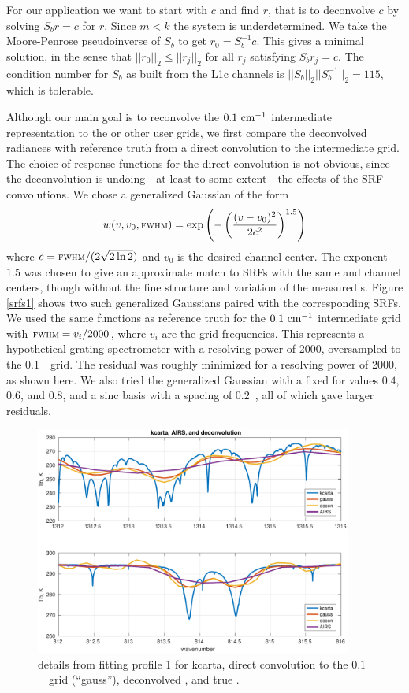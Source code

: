 \documentclass[11pt]{article}
\begin{document}
For our application we want to start with $c$ and find $r$, that is
to deconvolve $c$ by solving $S_b r = c$ for $r$.  Since $m < k$ the
system is underdetermined.  We take the Moore-Penrose pseudoinverse
\cite{wiki:pinv} of $S_b$ to get $r_0 = S_b^{-1} c$.  This gives a
minimal solution, in the sense that $||r_0||_2 \le ||r_j||_2$ for
all $r_j$ satisfying $S_b r_j = c$.  The condition number for $S_b$
as built from the L1c channels is $||S_b||_2||S_b^{-1}||_2 = 115$,
which is tolerable.

Although our main goal is to reconvolve the $0.1~\mbox{cm$^{-1}$}$ intermediate
representation to the {\cris} or other user grids, we first compare
the deconvolved radiances with reference truth from a direct
convolution to the intermediate grid.  The choice of response
functions for the direct convolution is not obvious, since the
deconvolution is undoing---at least to some extent---the effects of
the {\airs} SRF convolutions.  We chose a generalized Gaussian 
\cite{wiki:gauss} of the form
\[w(v, v_0, \mbox{\small\textsc{fwhm}}) = 
\exp\left(-\left(\frac{(v - v_0)^2}{2c^2}\right)^{1.5}\right) \]
where $c=\mbox{\small\textsc{fwhm}} / (2\sqrt{2\ln 2})$ and $v_0$ is the desired channel
center.  The exponent $1.5$ was chosen to give an approximate match
to {\airs} SRFs with the same {\FWHM} and channel centers, though
without the fine structure and variation of the measured \srf s.
Figure \ref{srfs1} shows two such generalized Gaussians paired with
the corresponding {\airs} SRFs.  We used the same functions as
reference truth for the $0.1~\mbox{cm$^{-1}$}$ intermediate grid with ${\mbox{\small\textsc{fwhm}}} =
v_i / 2000$, where $v_i$ are the grid frequencies.  This represents
a hypothetical grating spectrometer with a resolving power of 2000,
oversampled to the 0.1~\wn\ grid.  The residual was roughly
minimized for a resolving power of 2000, as shown here.  We also
tried the generalized Gaussian with a fixed {\FWHM} for values
$0.4$, $0.6$, and $0.8$, and a sinc basis with a spacing of
$0.2$~\wn, all of which gave larger residuals.

\begin{figure} %
  \centering
  \includegraphics[height=7.5cm]{figures/airs_decon_zoom.pdf}
  \caption{details from fitting profile 1 for kcarta, direct
    convolution to the $0.1$~\wn\ grid (``gauss''), deconvolved
    {\airs}, and true {\airs}.}
  \label{dzoom}
\end{figure}
\end{document}
